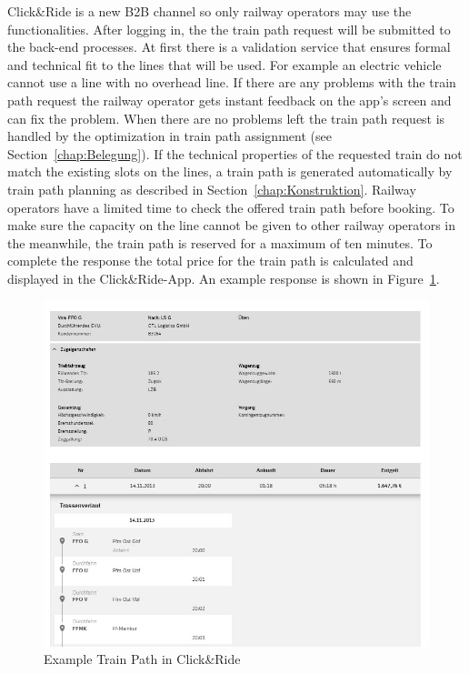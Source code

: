 Click\&Ride is a new B2B channel so only railway operators may use the functionalities. After logging in, the the train path request will be submitted to the back-end processes. At first there is a validation service that ensures formal and technical fit to the lines that will be used. For example an electric vehicle cannot use a line with no overhead line. If there are any problems with the train path request the railway operator gets instant feedback on the app's screen and can fix the problem. When there are no problems left the train path request is handled by the optimization in train path assignment (see Section~\ref{chap:Belegung}). If the technical properties of the requested train do not match the existing slots on the lines, a train path is generated automatically by train path planning as described in Section~\ref{chap:Konstruktion}. Railway operators have a limited time to check the offered train path before booking. To make sure the capacity on the line cannot be given to other railway operators in the meanwhile, the train path is reserved for a maximum of ten minutes. To complete the response the total price for the train path is calculated and displayed in the Click\&Ride-App. An example response is shown in Figure~\ref{fig:CnR_response}.
\begin{figure}[htb]
	\centering
	\includegraphics[width=\textwidth]{Bilder/train_path.jpg}
	\caption{Example Train Path in Click\&Ride}
	\label{fig:CnR_response}
\end{figure}

